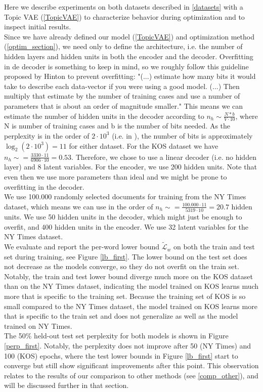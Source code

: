 \documentclass{report}
\begin{document}
	Here we describe experiments on both datasets described in \ref{datasets} with a Topic VAE (\ref{TopicVAE}) to characterize behavior during optimization and to inspect initial results. \\
	Since we have already defined our model (\ref{TopicVAE}) and optimization method (\ref{optim_section}), we need only to define the architecture, i.e. the number of hidden layers and hidden units in both the encoder and the decoder. Overfitting in de decoder is something to keep in mind, so we roughly follow this guideline proposed by Hinton \cite{hinton2012neural} to prevent overfitting: "(...) estimate how many bits it would take to describe each data-vector if you were using a good model. (...) Then multiply that estimate by the number of training cases and use a number of parameters that is about an order of magnitude smaller." This means we can estimate the number of hidden units in the decoder according to $n_h \sim \frac{N*b}{V \cdot 10}$, where N is number of training cases and b is the number of bits needed. As the perplexity is in the order of $2 \cdot 10^3$ (i.e. in \cite{ranganath2015deep}), the number of bits is approximately $\log_2(2 \cdot 10^3) = 11$ for either dataset. For the KOS dataset we have $n_h \sim = \frac{3330 \cdot 11}{6906\cdot 10} = 0.53$. Therefore, we chose to use a linear decoder (i.e. no hidden layer) and 8 latent variables. For the encoder, we use 200 hidden units. Note that even then we use more parameters than ideal and we might be prone to overfitting in the decoder. \\
	We use 100.000 randomly selected documents for training from the NY Times dataset, which means we can use in the order of $n_h \sim = \frac{100.000 \cdot 11}{5319\cdot 10} = 20.7$ hidden units. We use 50 hidden units in the decoder, which might just be enough to overfit, and 400 hidden units in the encoder. We use 32 latent variables for the NY Times dataset. \\
	We evaluate and report the per-word lower bound $\tilde{\mathcal{L}}_w$ on both the train and test set during training, see Figure \ref{lb_first}. The lower bound on the test set does not decrease as the models converge, so they do not overfit on the train set. Notably, the train and test lower bound diverge much more on the KOS dataset than on the NY Times dataset, indicating the model trained on KOS learns much more that is specific to the training set. Because the training set of KOS is so small compared to the NY Times dataset, the model trained on KOS learns more that is specific to the train set and does not generalize as well as the model trained on NY Times. \\
	The 50\% held-out test set perplexity for both models is shown in Figure \ref{perp_first}. Notably, the perplexity does not improve after 50 (NY Times) and 100 (KOS) epochs, where the test lower bounds in Figure \ref{lb_first} start to converge but still show significant improvements after this point. This observation relates to the results of our comparison to other methods (see \ref{comp_other}), and will be discussed further in that section.
	
\end{document}
